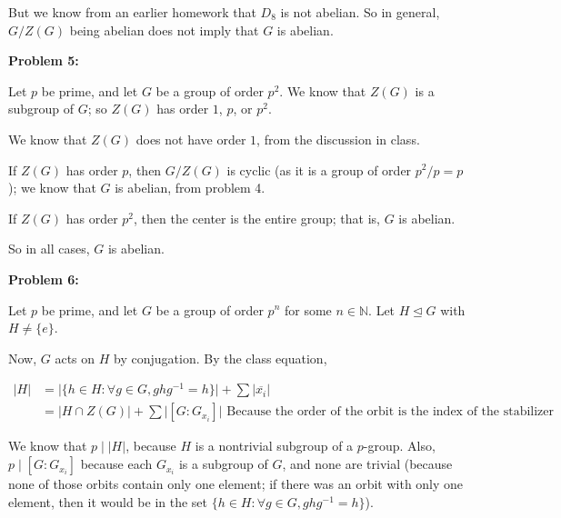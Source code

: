 \documentclass[a4paper,12pt]{article}
\newcommand{\tab}{\hspace{4mm}} %
\newcommand{\shunt}{\vspace{20mm}}
\newcommand{\absval}[1]{\lvert #1 \rvert}
\newcommand{\N}{\mathbb{N}}
\newcommand{\subgp}{\mathrel{\unlhd}}
\begin{document}
\tab But we know from an earlier homework that $D_8$ is not abelian. So in general, $G/Z(G)$ being abelian does not imply that $G$ is abelian.

\shunt

{\bf Problem 5:}

Let $p$ be prime, and let $G$ be a group of order $p^2$. We know that $Z(G)$ is a subgroup of $G$; so $Z(G)$ has order $1$, $p$, or $p^2$.

We know that $Z(G)$ does not have order $1$, from the discussion in class.

If $Z(G)$ has order $p$, then $G/Z(G)$ is cyclic (as it is a group of order $p^2/p = p$); we know that $G$ is abelian, from problem 4. 

If $Z(G)$ has order $p^2$, then the center is the entire group; that is, $G$ is abelian.

So in all cases, $G$ is abelian.

\shunt

{\bf Problem 6:}

Let $p$ be prime, and let $G$ be a group of order $p^n$ for some $n \in \N$. Let $H \subgp G$ with $H \neq \{e\}$.

Now, $G$ acts on $H$ by conjugation. By the class equation,

\begin{align*}
\absval{H} &= \absval{\{h \in H: \forall g \in G, ghg^{-1} = h\}} + \sum\absval{\overline{x_i}} \\
&=\absval{H \cap Z(G)} + \sum\absval{[G:G_{x_i}]} \text{ Because the order of the orbit is the index of the stabilizer}
\end{align*}

We know that $p \mid \absval{H}$, because $H$ is a nontrivial subgroup of a $p$-group. Also, $p \mid [G:G_{x_i}]$ because each $G_{x_i}$ is a subgroup of $G$, and none are trivial (because none of those orbits contain only one element; if there was an orbit with only one element, then it would be in the set $\{h \in H: \forall g \in G, ghg^{-1} = h\}$).

\shunt
\end{document}
